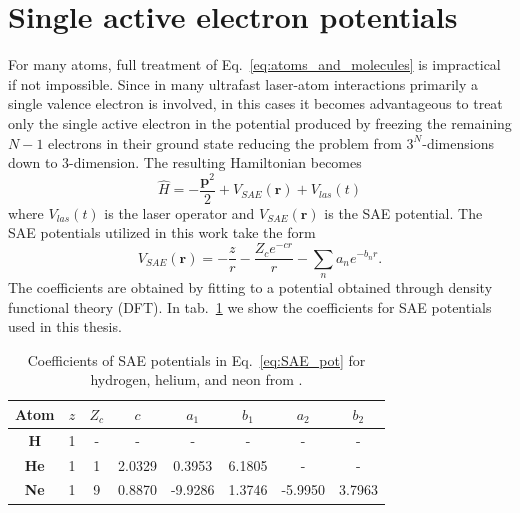 \section{Single active electron potentials}
\label{sec:SAE}
For many atoms, full treatment of Eq.~\ref{eq:atoms_and_molecules} is impractical if not impossible. Since in many ultrafast laser-atom interactions primarily a single valence electron is involved, in this cases it becomes advantageous to treat only the single active electron in the potential produced by freezing the remaining $N-1$ electrons in their ground state reducing the problem from $3^N$-dimensions down to 3-dimension. The resulting Hamiltonian becomes
\begin{equation}
  \label{eq:SAE_TDSE}
  \hat{H} = -\frac{\mathbf{p}^2}{2} + V_{SAE}(\mathbf{r}) + V_{las}(t)
\end{equation}
where $V_{las}(t)$ is the laser operator and $V_{SAE}(\mathbf{r})$ is the SAE potential. The SAE potentials utilized in this work take the form \cite{reiff2020} 
\begin{equation}
  \label{eq:SAE_pot}
  V_{SAE}(\mathbf{r}) = - \frac{z}{r} - \frac{Z_c e^{-c r}}{r} - \sum_n a_n e^{-b_n r}.
\end{equation}
The coefficients are obtained by fitting to a potential obtained through density functional theory (DFT).  In tab.~\ref{tab:SAE} we show the coefficients for SAE potentials used in this thesis.
\begin{table}
\begin{center}
 \begin{tabular}{|c|c|c|c|c|c|c|c|} 
 \hline
 \textbf{Atom} & $z$ & $Z_c$ & $c$ & $a_1$ & $b_1$ & $a_2$ & $b_2$ \\
 \hline
 \textbf{H} & 1 & - & - &  - & - &  - & - \\ 
 \hline
 \textbf{He} & 1 & 1 & 2.0329 &  0.3953 & 6.1805 &  - & - \\ 
 \hline
 \textbf{Ne} & 1 & 9 & 0.8870 &  -9.9286 & 1.3746 &  -5.9950 & 3.7963 \\ 
 \hline
\end{tabular}
\end{center}
 \caption{Coefficients of SAE potentials in Eq.~\ref{eq:SAE_pot} for hydrogen, helium, and neon from \cite{reiff2020}.}
 \label{tab:SAE}
\end{table}



